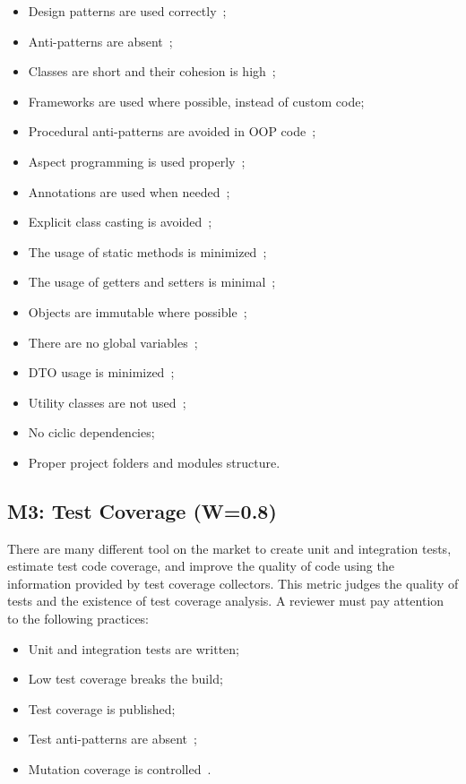 \documentclass[12pt,oneside]{article}
\begin{document}
\begin{itemize}
\item Design patterns are used correctly~\citep{gamma1993design,holub2004holub,freeman2008head,fowler2003patterns};
\item Anti-patterns are absent~\citep{jaafar2013mining};
\item Classes are short and their cohesion is high~\citep[pp.93-95]{e01};
\item Frameworks are used where possible, instead of custom code;
\item Procedural anti-patterns are avoided in OOP code~\citep[pp.19-26]{e01};
\item Aspect programming is used properly~\citep[pp.210--212]{e01};
\item Annotations are used when needed~\citep[pp.163]{eo2};
\item Explicit class casting is avoided~\citep[pp.181--186]{eo2};
\item The usage of static methods is minimized~\citep[pp.117--145]{eo2};
\item The usage of getters and setters is minimal~\citep[pp.165--174]{eo1};
\item Objects are immutable where possible~\citep[pp.78--89]{eo2};
\item There are no global variables~\citep{yb-global-vars};
\item DTO usage is minimized~\citep[pp.179]{eo2};
\item Utility classes are not used~\citep[pp.40]{eo2};
\item No ciclic dependencies;
\item Proper project folders and modules structure.
\end{itemize}

\subsection{M3: Test Coverage (W=0.8)}

There are many different tool on the market to create unit and integration tests,
estimate test code coverage, and improve the quality of code using
the information provided by test coverage collectors. This metric judges
the quality of tests and the existence of test coverage analysis. A reviewer
must pay attention to the following practices:

\begin{itemize}
  \item Unit and integration tests are written;
  \item Low test coverage breaks the build;
  \item Test coverage is published;
  \item Test anti-patterns are absent~\citep{yb-test-anti};
  \item Mutation coverage is controlled~\citep{andrews2006using}.
\end{itemize}
\end{document}
